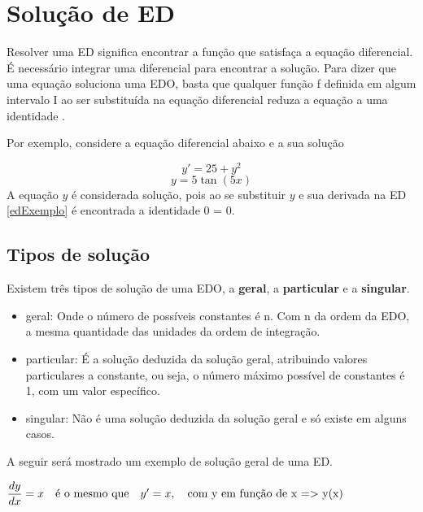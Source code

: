 \section[Solução de ED]{Solução de ED}

Resolver uma ED significa encontrar a função que satisfaça a equação diferencial. É necessário integrar uma diferencial para encontrar a solução.
Para dizer que uma equação soluciona uma EDO, basta que qualquer função f definida em algum intervalo I ao ser substituída na equação diferencial reduza a equação a uma identidade \cite{explicacaoEDO}.

\begin{flushleft}
Por exemplo, considere a equação diferencial abaixo e a sua solução 
\end{flushleft}

\begin{equation} \label{edExemplo} y' = 25 + y^2 \end{equation}  \begin{equation} y = 5\tan(5x) \end{equation} A equação $y$ é considerada solução, pois ao se substituir $y$ e sua derivada na ED \ref{edExemplo} é encontrada a identidade 0 = 0.

\subsection[Tipos de solução]{Tipos de solução}
Existem três tipos de solução de uma EDO, a \textbf{geral}, a \textbf{particular} e a \textbf{singular}.
\begin{itemize}
	\item{geral:} Onde o número de possíveis constantes é n. Com n da ordem da EDO, a mesma quantidade das unidades da ordem de integração. 
	\item{particular:} É a solução deduzida da solução geral, atribuindo valores particulares a constante, ou seja, o número máximo possível de constantes é 1, com um valor específico.
	\item{singular:} Não é uma solução deduzida da solução geral e só existe em alguns casos.
\end{itemize}

A seguir será mostrado um exemplo de solução geral de uma ED.  \linebreak

			$ \dfrac{dy}{dx} = x \quad  \textrm{é o mesmo que} \quad y' = x, \quad \textrm{com y em função de x => y(x)} \\
			$
			

